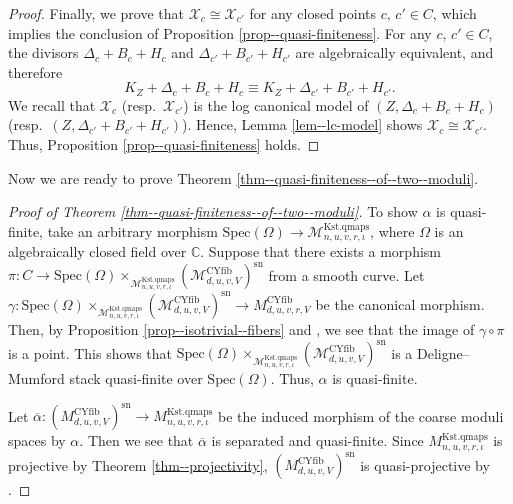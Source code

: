 \documentclass[12pt,twoside]{amsart}
\theoremstyle{definition}
\begin{document}
\begin{proof}
Finally, we prove that $\mathcal{X}_{c}\cong \mathcal{X}_{c'}$ for any closed points $c,\,c' \in C$, which implies the conclusion of Proposition \ref{prop--quasi-finiteness}. For any $c,\,c' \in C$, the divisors $\Delta_{c}+B_{c}+H_{c}$ and $\Delta_{c'}+B_{c'}+H_{c'}$ are algebraically equivalent, and therefore $$K_{Z}+\Delta_{c}+B_{c}+H_{c} \equiv K_{Z}+\Delta_{c'}+B_{c'}+H_{c'}.$$
We recall that $\mathcal{X}_{c}$ (resp.~$\mathcal{X}_{c'}$) is the log canonical model of $(Z, \Delta_{c}+B_{c}+H_{c})$ (resp.~$(Z, \Delta_{c'}+B_{c'}+H_{c'})$). 
Hence, Lemma \ref{lem--lc-model} shows $\mathcal{X}_{c}\cong \mathcal{X}_{c'}$. 
Thus, Proposition \ref{prop--quasi-finiteness} holds. 
\end{proof}   

Now we are ready to prove Theorem \ref{thm--quasi-finiteness--of--two--moduli}. 

\begin{proof}[Proof of Theorem \ref{thm--quasi-finiteness--of--two--moduli}]
To show $\alpha$ is quasi-finite, take an arbitrary morphism $\mathrm{Spec}(\Omega)\to \mathcal{M}^{\mathrm{Kst.qmaps}}_{n,u,v,r,\iota}$, where $\Omega$ is an algebraically closed field over $\mathbb{C}$.
Suppose that there exists a morphism $\pi\colon C\to \mathrm{Spec}(\Omega)\times_{\mathcal{M}^{\mathrm{Kst.qmaps}}_{n,u,v,r,\iota}}(\mathcal{M}^{\mathrm{CYfib}}_{d,u,v,V})^{\mathrm{sn}}$ from a smooth curve.
Let $\gamma\colon \mathrm{Spec}(\Omega)\times_{\mathcal{M}^{\mathrm{Kst.qmaps}}_{n,u,v,r,\iota}}(\mathcal{M}^{\mathrm{CYfib}}_{d,u,v,V})^{\mathrm{sn}}\to M^{\mathrm{CYfib}}_{d,u,v,r,V}$ be the canonical morphism.
Then, by Proposition \ref{prop--isotrivial--fibers} and \cite[Proposition 6.3]{Hat23}, we see that the image of $\gamma\circ\pi$ is a point.
This shows that $\mathrm{Spec}(\Omega)\times_{\mathcal{M}^{\mathrm{Kst.qmaps}}_{n,u,v,r,\iota}}(\mathcal{M}^{\mathrm{CYfib}}_{d,u,v,V})^{\mathrm{sn}}$ is a Deligne--Mumford stack quasi-finite over $\mathrm{Spec}(\Omega)$.
Thus, $\alpha$ is quasi-finite.

Let $\overline{\alpha}\colon(M^{\mathrm{CYfib}}_{d,u,v,V})^{\mathrm{sn}}\to M^{\mathrm{Kst.qmaps}}_{n,u,v,r,\iota}$ be the induced morphism of the coarse moduli spaces by $\alpha$.
Then we see that $\overline{\alpha}$ is separated and quasi-finite.
Since $M^{\mathrm{Kst.qmaps}}_{n,u,v,r,\iota}$ is projective by Theorem \ref{thm--projectivity}, $(M^{\mathrm{CYfib}}_{d,u,v,V})^{\mathrm{sn}}$ is quasi-projective by \cite[Theorem 7.2.10]{Ols}.
\end{proof}
\end{document}
